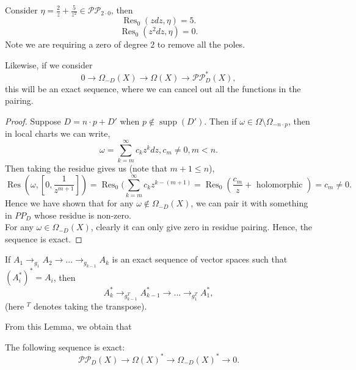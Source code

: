 \documentclass{article}
\begin{document}
{\begin{example}
    Consider $\eta = \frac{2}{z} + \frac{5}{z^2} \in \mathcal{PP}_{2 \cdot 0}$, then
    \[\operatorname{Res}_0(z dz, \eta) = 5.\]
    \[\operatorname{Res}_0(z^2 dz, \eta) = 0.\]
    Note we are requiring a zero of degree $2$ to remove all the poles.
\end{example}

\begin{proposition}
    Likewise, if we consider
    \[0 \to \Omega_{-D}(X) \to \Omega(X) \to \mathcal{P} \mathcal{P}^*_D(X),\]
    this will be an exact sequence, where we can cancel out all the functions in the pairing.
\end{proposition}

\begin{proof}
    Suppose $D = n \cdot p + D'$ when $p \notin \operatorname{supp}(D')$. Then if $\omega \in \Omega \setminus \Omega_{-n \cdot p}$, then in local charts we can write,
    \[\omega = \sum_{k = m}^\infty c_k z^k dz, c_m \neq 0, m < n.\]
    Then taking the residue gives us (note that $m+1 \leq n$), 
    \[\operatorname{Res}(\omega, [0, \frac{1}{z^{m+1}}]) = \operatorname{Res}_0(\sum_{k = m}^{\infty} c_k z^{k-(m+1)} = \operatorname{Res}_0 (\frac{c_m}{z} + \text{ holomorphic }) = c_m \neq 0. \]
    Hence we have shown that for any $\omega \notin \Omega_{-D}(X)$, we can pair it with something in $PP_D$ whose residue is non-zero.\\

    For any $\omega \in \Omega_{-D}(X)$, clearly it can only give zero in residue pairing. Hence, the sequence is exact.
\end{proof}


\begin{lemma}
    If $A_1 \to_{g_1} A_2 \to ... \to_{g_{k-1}} A_k$ is an exact sequence of vector spaces such that $(A_i^*)^* = A_i$, then
    \[A^*_k \to_{g_{k-1}^T} A^*_{k-1} \to ... \to_{g_1^{T}} A_1^*,\]
    (here $^T$ denotes taking the transpose).
\end{lemma}

From this Lemma, we obtain that
\begin{proposition}
    The following sequence is exact:
    \[\mathcal{P} \mathcal{P}_D(X) \to \Omega(X)^* \to \Omega_{-D}(X)^* \to 0.\]
\end{proposition}

}
\end{document}
